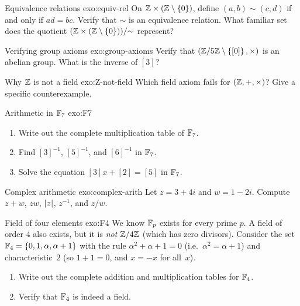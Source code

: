 \begin{exercise}{Equivalence relations \basic}{exo:equiv-rel}
On ${\mathbb{Z}}\times({\mathbb{Z}}\setminus\left\{0\right\})$, define $(a,b)\sim(c,d)$ if and only if
$ad=bc$. Verify that $\sim$ is an equivalence relation. What familiar set
does the quotient $({\mathbb{Z}}\times({\mathbb{Z}}\setminus\left\{0\right\}))/{\sim}$ represent?
\end{exercise}

\begin{exercise}{Verifying group axioms \basic}{exo:group-axioms}
Verify that $({\mathbb{Z}}/5{\mathbb{Z}}\setminus\left\{[0]\right\},\times)$ is an abelian group. What
is the inverse of $[3]$?
\end{exercise}

\begin{exercise}{Why ${\mathbb{Z}}$ is not a field \basic}{exo:Z-not-field}
Which field axiom fails for $({\mathbb{Z}},+,\times)$? Give a specific
counterexample.
\end{exercise}

\begin{exercise}{Arithmetic in ${\mathbb{F}}_7$ \intermediate}{exo:F7}
\begin{enumerate}[label=(\alph*)]
  \item Write out the complete multiplication table of ${\mathbb{F}}_7$.
  \item Find $[3]^{-1}$, $[5]^{-1}$, and $[6]^{-1}$ in ${\mathbb{F}}_7$.
  \item Solve the equation $[3]x + [2] = [5]$ in ${\mathbb{F}}_7$.
\end{enumerate}
\end{exercise}

\begin{exercise}{Complex arithmetic \basic}{exo:complex-arith}
Let $z=3+4i$ and $w=1-2i$. Compute $z+w$, $zw$, $\lvert z\rvert$, $z^{-1}$, and
$z/w$.
\end{exercise}

\begin{exercise}{Field of four elements \challenging}{exo:F4}
We know ${\mathbb{F}}_p$ exists for every prime $p$. A field of order $4$ also
exists, but it is \emph{not} ${\mathbb{Z}}/4{\mathbb{Z}}$ (which has zero divisors). Consider
the set ${\mathbb{F}}_4=\left\{0,1,\alpha,\alpha+1\right\}$ with the rule $\alpha^2+\alpha+1=0$
(i.e.\ $\alpha^2=\alpha+1$) and characteristic~$2$ (so $1+1=0$, and
$x=-x$ for all~$x$).
\begin{enumerate}[label=(\alph*)]
  \item Write out the complete addition and multiplication tables for
    ${\mathbb{F}}_4$.
  \item Verify that ${\mathbb{F}}_4$ is indeed a field.
\end{enumerate}
\end{exercise}

